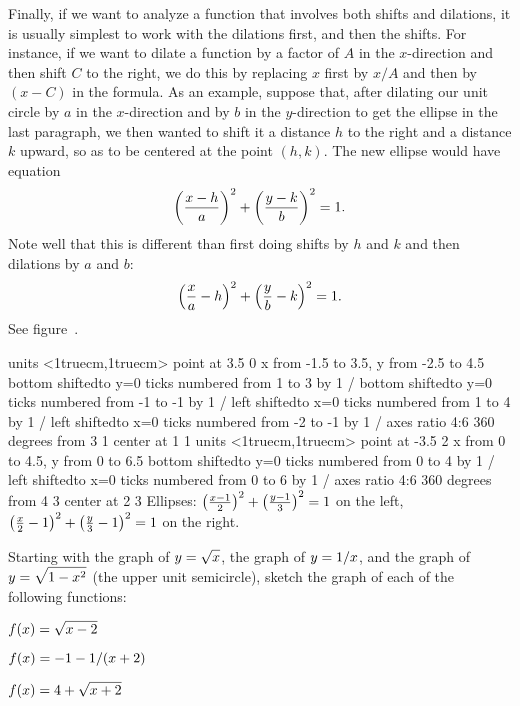Finally, if we want to analyze a function that involves both
shifts and dilations, it is usually simplest to work with the
dilations first, and then the shifts.  For instance, if we want to
dilate a function by a factor of $A$ in the $x$-direction and then
shift $C$ to the right, we do this by replacing $x$ first by $x/A$
and then by $(x-C)$ in the formula.  As an example, suppose that,
after dilating our unit circle by $a$ in the $x$-direction and by $b$
in the $y$-direction to get the ellipse in the last paragraph, we then
wanted to shift it a distance $h$ to the right and a distance $k$
upward, so as to be centered at the point $(h,k)$.  The new ellipse
would have equation
$$
\left({x-h\over a}\right)^2+\left({y-k\over b}\right)^2=1.
$$
Note well that this is different than first doing shifts by $h$ and $k$ and
then dilations by $a$ and $b$:
$$
\left({x\over a}-h\right)^2+\left({y\over b}-k\right)^2=1.
$$
See figure~.

\figure
\texonly
\vbox{\beginpicture
\normalgraphs
\ninepoint
\setcoordinatesystem units <1truecm,1truecm> point at 3.5 0
\setplotarea x from -1.5 to 3.5, y from -2.5 to 4.5
\axis bottom shiftedto y=0 ticks numbered from 1 to 3 by 1 /
\axis bottom shiftedto y=0 ticks numbered from -1 to -1 by 1 /
\axis left shiftedto x=0 ticks numbered from 1 to 4 by 1 /
\axis left shiftedto x=0 ticks numbered from -2 to -1 by 1 /
\setquadratic
\ellipticalarc axes ratio 4:6 360 degrees from 3 1 center at 1 1
\setcoordinatesystem units <1truecm,1truecm> point at -3.5 2
\setplotarea x from 0 to 4.5, y from 0 to 6.5
\axis bottom shiftedto y=0 ticks numbered from 0 to 4 by 1 /
\axis left shiftedto x=0 ticks numbered from 0 to 6 by 1 /
\setquadratic
\ellipticalarc axes ratio 4:6 360 degrees from 4 3 center at 2 3
\endpicture}
\endtexonly
{}
\begincaption
Ellipses: $\left({x-1\over 2}\right)^2+\left({y-1\over 3}\right)^2=1$ on the left, $\left({x\over 2}-1\right)^2+\left({y\over 3}-1\right)^2=1$ on the right.
\endcaption
\endfigure

\exercises

Starting with the graph of $\displaystyle y=\sqrt{x}$, the graph of $\displaystyle y=1/x$, and the
graph of $\displaystyle y=\sqrt{1-x^2}$ (the upper unit semicircle), sketch the
graph of each of the following functions:

\twocol
\exercise $\displaystyle f(x)=\sqrt{x-2}$
\endexercise

\exercise $\displaystyle f(x)=-1-1/(x+2)$
\endexercise

\exercise $\displaystyle f(x)=4+\sqrt{x+2}$
\endexercise

